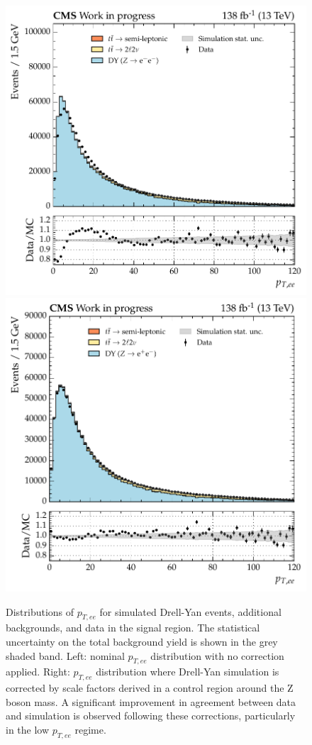 \begin{figure}[htbp!]
\centering
\includegraphics[width =0.46\linewidth]{Figures/Hee/simulationCorrections/DY/ggH_BDT_dielectronPt.pdf}\hfill%
\includegraphics[width =0.46\linewidth]{Figures/Hee/simulationCorrections/DY/ggH_BDT_pt_reweighted_dielectronPt.pdf}\hfill%
\caption[The dielectron transverse momentum distribution for simulated background events, corrected by scale factors derived in the \Hee control region.]{Distributions of $p_{T,ee}$ for simulated Drell-Yan events, additional \ttbar backgrounds, and data in the signal region. The statistical uncertainty on the total background yield is shown in the grey shaded band. Left: nominal $p_{T,ee}$ distribution with no correction applied. Right: $p_{T,ee}$ distribution where Drell-Yan simulation is corrected by scale factors derived in a control region around the Z boson mass. A significant improvement in agreement between data and simulation is observed following these corrections, particularly in the low $p_{T,ee}$ regime.}
\label{fig:ggH_ptee_reweighting}
\end{figure}